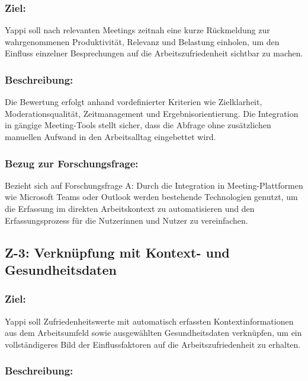 \documentclass[12pt,a4paper]{report}
\begin{document}
\subsubsection{Ziel:}

Yappi soll nach relevanten Meetings zeitnah eine kurze Rückmeldung zur wahrgenommenen Produktivität, Relevanz und Belastung
einholen, um den Einfluss einzelner Besprechungen auf die Arbeitszufriedenheit sichtbar zu machen.

\subsubsection{Beschreibung:}

Die Bewertung erfolgt anhand vordefinierter Kriterien wie Zielklarheit, Moderationsqualität, Zeitmanagement und
Ergebnisorientierung. Die Integration in gängige Meeting-Tools stellt sicher, dass die Abfrage ohne zusätzlichen manuellen Aufwand
in den Arbeitsalltag eingebettet wird.

\subsubsection{Bezug zur Forschungsfrage:}

Bezieht sich auf Forschungsfrage A: Durch die Integration in Meeting-Plattformen wie Microsoft Teams oder Outlook werden
bestehende Technologien genutzt, um die Erfassung im direkten Arbeitskontext zu automatisieren und den Erfassungsprozess für die
Nutzerinnen und Nutzer zu vereinfachen.

\subsection{Z-3: Verknüpfung mit Kontext- und Gesundheitsdaten}

\subsubsection{Ziel:}

Yappi soll Zufriedenheitswerte mit automatisch erfassten Kontextinformationen aus dem Arbeitsumfeld sowie ausgewählten
Gesundheitsdaten verknüpfen, um ein vollständigeres Bild der Einflussfaktoren auf die Arbeitszufriedenheit zu erhalten.

\subsubsection{Beschreibung:}
\end{document}
